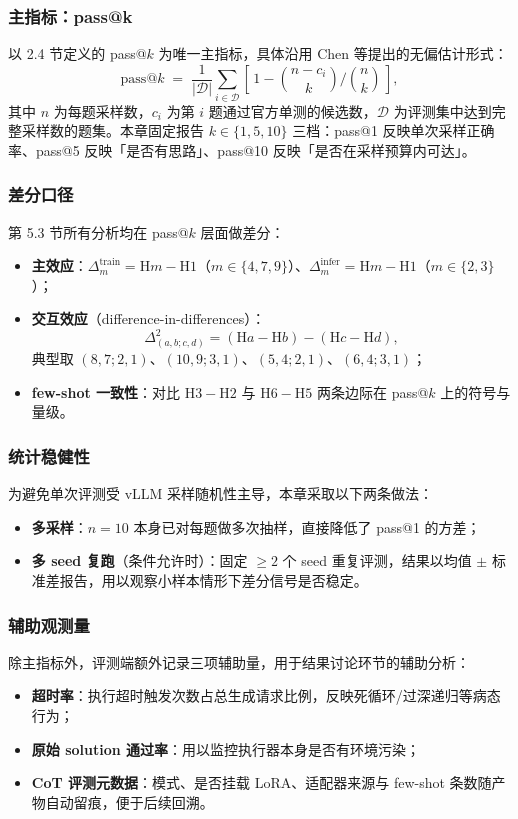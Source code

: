 
\subsubsection{主指标：pass@k}
以 2.4 节定义的 pass@$k$ 为唯一主指标，具体沿用 Chen 等提出的无偏估计形式：
\[
\mathrm{pass@}k \;=\; \frac{1}{|\mathcal{D}|}\sum_{i \in \mathcal{D}}\!\left[\,1 - \binom{n-c_i}{k}\Big/\binom{n}{k}\,\right],
\]
其中 $n$ 为每题采样数，$c_i$ 为第 $i$ 题通过官方单测的候选数，$\mathcal{D}$ 为评测集中达到完整采样数的题集。本章固定报告 $k \in \{1, 5, 10\}$ 三档：pass@1 反映单次采样正确率、pass@5 反映「是否有思路」、pass@10 反映「是否在采样预算内可达」。

\subsubsection{差分口径}
第 5.3 节所有分析均在 pass@$k$ 层面做差分：
\begin{itemize}
    \item \textbf{主效应}：$\Delta^{\text{train}}_{m} = \mathrm{H}m - \mathrm{H1}$（$m \in \{4,7,9\}$）、$\Delta^{\text{infer}}_{m} = \mathrm{H}m - \mathrm{H1}$（$m \in \{2,3\}$）；
    \item \textbf{交互效应}（difference-in-differences）：
    \[
    \Delta^{2}_{(a,b;c,d)} = (\mathrm{H}a - \mathrm{H}b) - (\mathrm{H}c - \mathrm{H}d),
    \]
    典型取 $(8,7;2,1)$、$(10,9;3,1)$、$(5,4;2,1)$、$(6,4;3,1)$；
    \item \textbf{few-shot 一致性}：对比 $\mathrm{H3}-\mathrm{H2}$ 与 $\mathrm{H6}-\mathrm{H5}$ 两条边际在 pass@$k$ 上的符号与量级。
\end{itemize}

\subsubsection{统计稳健性}
为避免单次评测受 vLLM 采样随机性主导，本章采取以下两条做法：
\begin{itemize}
    \item \textbf{多采样}：$n{=}10$ 本身已对每题做多次抽样，直接降低了 pass@1 的方差；
    \item \textbf{多 seed 复跑}（条件允许时）：固定 $\ge 2$ 个 seed 重复评测，结果以均值 $\pm$ 标准差报告，用以观察小样本情形下差分信号是否稳定。
\end{itemize}

\subsubsection{辅助观测量}
除主指标外，评测端额外记录三项辅助量，用于结果讨论环节的辅助分析：
\begin{itemize}
    \item \textbf{超时率}：执行超时触发次数占总生成请求比例，反映死循环/过深递归等病态行为；
    \item \textbf{原始 solution 通过率}：用以监控执行器本身是否有环境污染；
    \item \textbf{CoT 评测元数据}：模式、是否挂载 LoRA、适配器来源与 few-shot 条数随产物自动留痕，便于后续回溯。
\end{itemize}